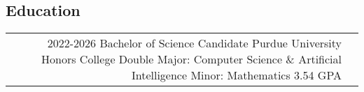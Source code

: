 \documentclass[
	10pt, %
]{FreemanCV}
\begin{document}
\begin{paracol}{2}

	\section{Education}




	\begin{supertabular}{r l} %


		\qualificationentry
		{2022-2026} %
		{Bachelor of Science Candidate} %
		{Purdue University Honors College} %
		{Double Major: Computer Science \& Artificial Intelligence} %
		{Minor: Mathematics}
		{3.54 GPA} %




	\end{supertabular}




\end{paracol}
\end{document}

